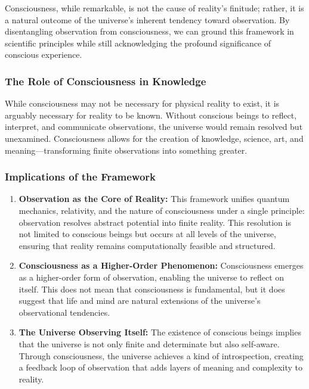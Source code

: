 \documentclass[12pt]{article}
\begin{document}
Consciousness, while remarkable, is not the cause of reality’s finitude; rather, it is a natural outcome of the universe’s inherent tendency toward observation. By disentangling observation from consciousness, we can ground this framework in scientific principles while still acknowledging the profound significance of conscious experience.

\subsubsection{The Role of Consciousness in Knowledge}

While consciousness may not be necessary for physical reality to exist, it is arguably necessary for reality to be known. Without conscious beings to reflect, interpret, and communicate observations, the universe would remain resolved but unexamined. Consciousness allows for the creation of knowledge, science, art, and meaning—transforming finite observations into something greater.

\subsubsection{Implications of the Framework}

\begin{enumerate}
    \item \textbf{Observation as the Core of Reality:} This framework unifies quantum mechanics, relativity, and the nature of consciousness under a single principle: observation resolves abstract potential into finite reality. This resolution is not limited to conscious beings but occurs at all levels of the universe, ensuring that reality remains computationally feasible and structured.

    \item \textbf{Consciousness as a Higher-Order Phenomenon:} Consciousness emerges as a higher-order form of observation, enabling the universe to reflect on itself. This does not mean that consciousness is fundamental, but it does suggest that life and mind are natural extensions of the universe’s observational tendencies.

    \item \textbf{The Universe Observing Itself:} The existence of conscious beings implies that the universe is not only finite and determinate but also self-aware. Through consciousness, the universe achieves a kind of introspection, creating a feedback loop of observation that adds layers of meaning and complexity to reality.
\end{enumerate}
\end{document}

